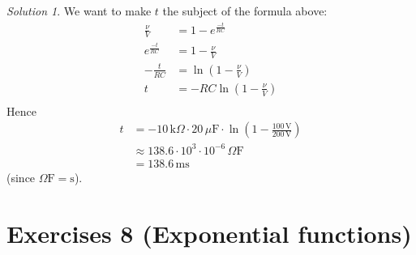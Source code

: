 \documentclass[
  12pt,
  oneside]{book}
\theoremstyle{definition}
\theoremstyle{definition}
\theoremstyle{definition}
\theoremstyle{definition}
\theoremstyle{remark}
\newtheorem*{solution}{Solution}
\begin{document}
\begin{solution}
We want to make \(t\) the subject of the formula above:
\begin{align*}
\frac{\nu}{V} &=1-e^{\frac{-t}{RC}}\\
e^{\frac{-t}{RC}} &= 1-\frac{\nu}{V}\\
-\frac{t}{RC} &= \ln\left(1-\frac{\nu}{V}\right)\\
t &= -RC\ln\left(1-\frac{\nu}{V}\right)\\
\end{align*}
Hence
\begin{align*}
t&=-10\,\mathrm{k}\Omega\cdot 20\,\mu\mathrm{F}\cdot \ln\left(1-\frac{100\,\mathrm{V}}{200\,\mathrm{V}}\right)\\
&\approx 138.6\cdot 10^3\cdot 10^{-6} \,\Omega\mathrm{F}\\
&= 138.6 \,\mathrm{ms}
\end{align*}
(since \(\Omega\mathrm{F} = \mathrm{s}\)).
\end{solution}

\chapter*{Exercises 8 (Exponential functions)}\label{exercises-8-exponential-functions}
\end{document}
